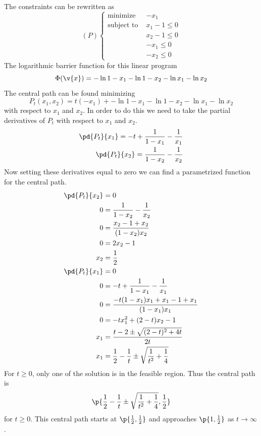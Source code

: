 \documentclass[11pt, oneside]{article}
\begin{document}
\begin{enumerate}
    The constraints can be rewritten as
    \[
      (P)
      \begin{cases} 
        \text{minimize }   & -x_1 \\
        \text{subject to } & x_1 - 1 \leq 0 \\
                           & x_2 - 1 \leq 0 \\
                           & -x_1 \leq 0 \\
                           & -x_2 \leq 0
      \end{cases}
    \]
    The logarithmic barrier function for this linear program
    \[
      \Phi(\v{x}) = -\ln{1 - x_1} - \ln{1 - x_2} - \ln{x_1} - \ln{x_2}
    \]
    The central path can be found minimizing
    \[
      P_t(x_1, x_2) = t (-x_1) + -\ln{1 - x_1} - \ln{1 - x_2} - \ln{x_1} - \ln{x_2}
    \]
    with respect to $x_1$ and $x_2$.
    In order to do this we need to take the partial derivatives of $P_t$ with
    respect to $x_1$ and $x_2$.
    \begin{align*}
      \pd{P_t}{x_1} = -t + \frac{1}{1 - x_1} - \frac{1}{x_1} \\
      \pd{P_t}{x_2} = \frac{1}{1 - x_2} - \frac{1}{x_2}
    \end{align*}
    Now setting these derivatives equal to zero we can find a parametrized
    function for the central path.
    \begin{align*}
      \pd{P_t}{x_2} &= 0 \\
      0 &= \frac{1}{1 - x_2} - \frac{1}{x_2} \\
      0 &= \frac{x_2 - 1 + x_2}{(1 - x_2)x_2} \\
      0 &= 2x_2 - 1 \\
      x_2 &= \frac{1}{2} \\
      \pd{P_t}{x_1} &= 0 \\
      0 &= -t + \frac{1}{1 - x_1} - \frac{1}{x_1} \\
      0 &= \frac{-t(1 - x_1)x_1 + x_1 - 1 + x_1}{(1 - x_1)x_1} \\
      0 &= -t x_1^2 + (2 - t)x_2 - 1 \\
      x_1 &= \frac{t - 2 \pm \sqrt{(2-t)^2 + 4t}}{2t} \\
      x_1 &= \frac{1}{2} - \frac{1}{t} \pm \sqrt{\frac{1}{t^2} + \frac{1}{4}} \\
    \end{align*}
    For $t \ge 0$, only one of the solution is in the feasible region.
    Thus the central path is
    \[
      \p{\frac{1}{2} - \frac{1}{t} \pm \sqrt{\frac{1}{t^2} + \frac{1}{4}}, \frac{1}{2}}
    \]
    for $t \ge 0$.
    This central path starts at $\p{\frac{1}{2}, \frac{1}{2}}$ and approaches
    $\p{1, \frac{1}{2}}$ as $t \to \infty$.


\end{enumerate}
\end{document}
